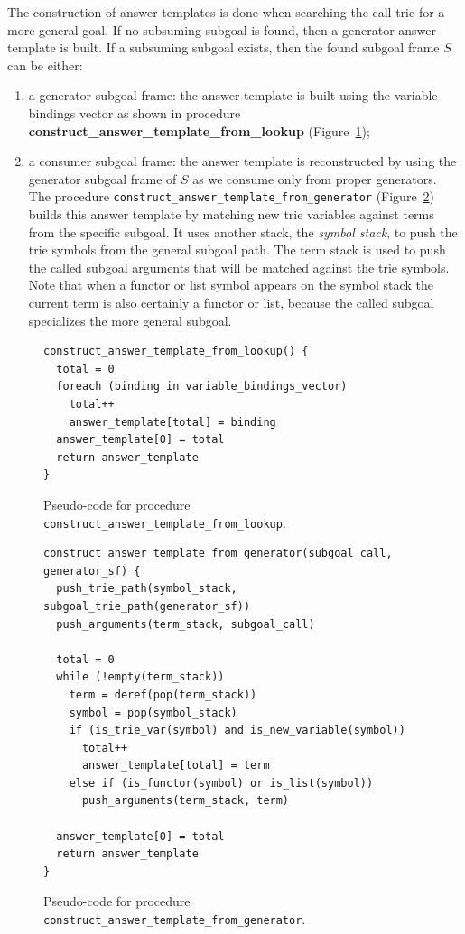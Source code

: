 The construction of answer templates is done when searching the call trie for a more general goal.
If no subsuming subgoal is found, then a generator answer template is built. If a subsuming subgoal
exists, then the found subgoal frame $S$ can be either:

\begin{enumerate}
  \item a generator subgoal frame: the answer template is built using
  the variable bindings vector as shown in procedure \textbf{construct\_answer\_template\_from\_lookup}
  (Figure~\ref{fig:construct_answer_template_from_lookup});
  
  \item a consumer subgoal frame: the answer template is reconstructed by using the generator
  subgoal frame of $S$ as we consume only from proper generators. 
  The procedure \texttt{construct\_answer\_template\_from\_generator}
  (Figure~\ref{fig:construct_answer_template_from_generator}) builds this answer template by
  matching new trie variables against terms from the specific subgoal. It
  uses another stack, the \textit{symbol stack}, to push the trie
  symbols from the general subgoal path. The term stack is used to push the called subgoal arguments that
  will be matched against the trie symbols. Note that when a functor or list symbol appears
  on the symbol stack the current term is also certainly a functor or list, because the called subgoal
  specializes the more general subgoal.
\end{enumerate}

\begin{figure}[ht]
\begin{Verbatim}
construct_answer_template_from_lookup() {
  total = 0
  foreach (binding in variable_bindings_vector)
    total++
    answer_template[total] = binding
  answer_template[0] = total
  return answer_template
}
\end{Verbatim}
\caption{Pseudo-code for procedure \texttt{construct\_answer\_template\_from\_lookup}.}
\label{fig:construct_answer_template_from_lookup}
\end{figure}

\begin{figure}[ht]
\begin{Verbatim}
construct_answer_template_from_generator(subgoal_call, generator_sf) {
  push_trie_path(symbol_stack, subgoal_trie_path(generator_sf))
  push_arguments(term_stack, subgoal_call)
  
  total = 0
  while (!empty(term_stack))
    term = deref(pop(term_stack))
    symbol = pop(symbol_stack)
    if (is_trie_var(symbol) and is_new_variable(symbol))
      total++
      answer_template[total] = term
    else if (is_functor(symbol) or is_list(symbol))
      push_arguments(term_stack, term)
  
  answer_template[0] = total
  return answer_template
}
\end{Verbatim}
\caption{Pseudo-code for procedure \texttt{construct\_answer\_template\_from\_generator}.}
\label{fig:construct_answer_template_from_generator}
\end{figure}


